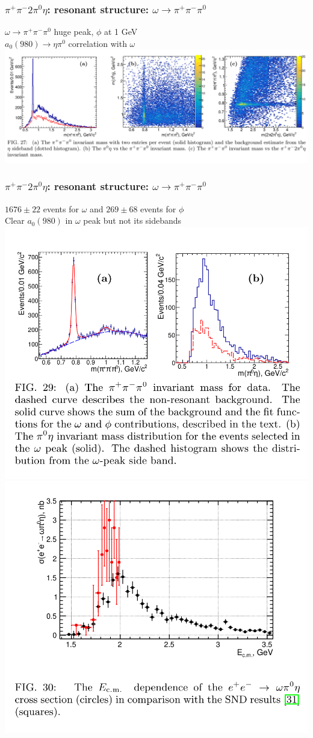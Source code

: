 \documentclass[10pt, aspectratio=169]{beamer}
\def\pip{\pi^+}
\def\pim{\pi^-}
\def\piz{\pi^0}
\begin{document}
\begin{frame}[label=2pieta-res-omega]%
  \frametitle{$\pip\pim2\piz\eta$: resonant structure: 
  $\omega\to\pip\pim\piz$}
  \centering

  $\omega\to\pip\pim\piz$ huge peak, $\phi$ at 1 GeV \\
  $a_0(980)\to\eta\piz$ correlation with $\omega$ \\[1ex]

  \includegraphics[width=\textwidth]{figures/003/fig027}
\end{frame}%

\begin{frame}[label=2pieta-res-omega]%
  \frametitle{$\pip\pim2\piz\eta$: resonant structure: 
  $\omega\to\pip\pim\piz$}
  \centering

  $1676 \pm 22$ events for $\omega$ and $269 \pm 68$ events for $\phi$ \\
  Clear $a_0(980)$ in $\omega$ peak but not its sidebands \\[1ex]

  \includegraphics[width=.48\textwidth]{figures/003/fig029}
  \includegraphics[width=.48\textwidth]{figures/003/fig030}
\end{frame}%
\end{document}
